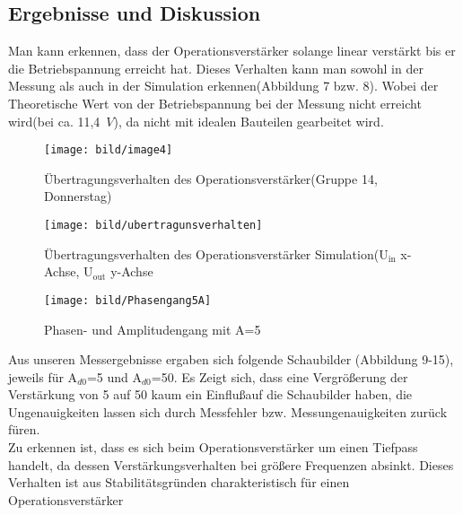 \subsection{Ergebnisse und Diskussion}
Man kann erkennen, dass der Operationsverst\"arker solange linear verst\"arkt bis er die Betriebspannung erreicht hat. Dieses Verhalten kann man sowohl in der Messung als auch in der Simulation erkennen(Abbildung 7 bzw. 8). Wobei der Theoretische Wert von der Betriebspannung bei der Messung nicht erreicht wird(bei ca. 11,4~$V$), da nicht mit idealen Bauteilen gearbeitet wird. 
\begin{figure}[!ht]
\begin{center}
\texttt{[image: bild/image4]}
\caption{\"Ubertragungsverhalten des Operationsverst\"arker(Gruppe 14, Donnerstag)}
\end{center}
\end{figure}
\begin{figure}[!ht]
\begin{center}
\texttt{[image: bild/ubertragunsverhalten]}
\caption{\"Ubertragungsverhalten des Operationsverst\"arker Simulation(U$_{\text{in}}$ x-Achse, U$_{\text{out}}$ y-Achse}
\end{center}
\end{figure}
\begin{figure}[!ht]
\begin{center}
\texttt{[image: bild/Phasengang5A]}
\caption{Phasen- und Amplitudengang mit A=5}
\end{center}
\end{figure}
Aus unseren Messergebnisse ergaben sich folgende Schaubilder (Abbildung 9-15), jeweils f\"ur A$_{d0}$=5 und A$_{d0}$=50. Es Zeigt sich, dass eine Vergr\"o\ss erung der Verst\"arkung von 5 auf 50 kaum ein Einflu\ss auf die Schaubilder haben, die Ungenauigkeiten lassen sich durch Messfehler bzw. Messungenauigkeiten zur\"uck f\"uren.\\
\noindent
Zu erkennen ist, dass es sich beim Operationsverst\"arker um einen Tiefpass handelt, da dessen Verst\"arkungsverhalten bei gr\"o\ss ere Frequenzen absinkt. Dieses Verhalten ist aus Stabilit\"atsgr\"unden charakteristisch f\"ur einen Operationsverst\"arker
